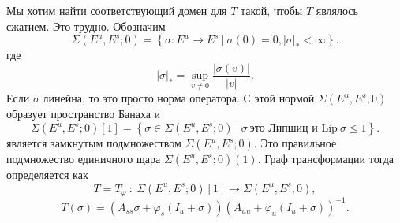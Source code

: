\begin{demo}
Мы хотим найти соответствующий домен для $T$ такой, чтобы $T$ являлось сжатием. Это трудно. Обозначим
$$
\Sigma(E^u,E^s;0) = \left\{ \sigma: E^u \rightarrow E^s \ | \  \sigma (0) = 0, |\sigma|_* < \infty \right\}.
$$
где 
$$
| \sigma |_* = \sup\limits_{v \neq 0} \frac{|\sigma(v)|}{|v|}.
$$
Если $\sigma$ линейна, то это просто норма оператора. С этой нормой $\Sigma(E^u,E^s;0)$ образует пространство Банаха и
$$
\Sigma(E^u,E^s;0)[1]=\left\{\sigma \in \Sigma(E^u,E^s;0) \ | \ \sigma \ \textrm{это Липшиц и Lip} \ \sigma \leqslant 1 \right\}.
$$
является замкнутым подмножеством $\Sigma(E^u,E^s;0)$. Это правильное подмножество единичного щара $\Sigma(E^u, E^s;0)(1)$. Граф трансформации тогда определяется как
$$
T=T_{\varphi} \ : \ \Sigma(E^u, E^s;0)[1] \rightarrow \Sigma(E^u, E^s;0), 
$$
$$
T(\sigma)=(A_{ss}\sigma + \varphi_s(I_u + \sigma))(A_{uu}+\varphi_u(I_u+\sigma))^{-1}.
$$


\end{demo}
